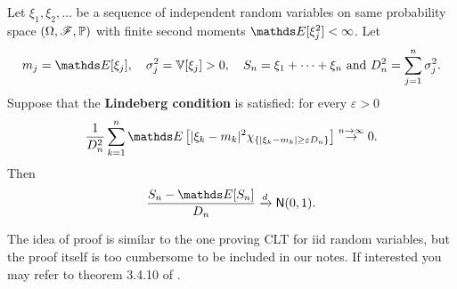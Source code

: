 \begin{theorem}
Let $\xi_1, \xi_2, \dots$ be a sequence of independent random variables on same probability space $(\Omega,\mathcal{F},\mathbb{P})$ with finite second moments $\E[\xi_j^2] < \infty$. Let 
$$m_j = \E[\xi_j], \quad \sigma_j^2 = \V[\xi_j] >0,\quad S_n = \xi_1 + \cdots + \xi_n \text{ and } D_n^2 = \sum_{j=1}^n \sigma_j^2.$$ 
Suppose that the \textbf{Lindeberg condition} is satisfied: for every $\varepsilon > 0$
\begin{equation} \label{eq:Lindeberg_original}
    \frac{1}{D_n^2}\sum_{k=1}^n \E\sqbracket{|\xi_k - m_k|^2 \chi_{\set{|\xi_k-m_k|\ge \varepsilon D_n}}} \overset{n\to\infty} \to 0.
\end{equation}
Then 
\begin{equation*}
    \frac{S_n - \E[S_n]}{D_n} \xrightarrow{d} \mathsf{N}(0,1).
\end{equation*}
\end{theorem}

The idea of proof is similar to the one proving CLT for iid random variables, but the proof itself is too cumbersome to be included in our notes. If interested you may refer to theorem 3.4.10 of \cite{Durrett}.

